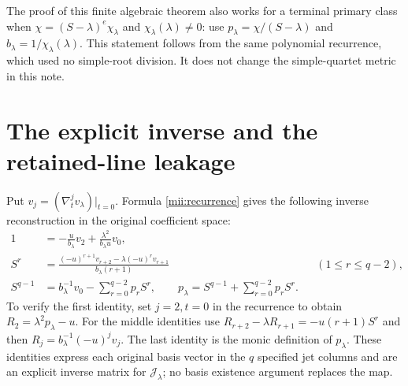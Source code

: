 \documentclass[11pt]{article}
\begin{document}
The proof of this finite algebraic theorem also works for a
terminal primary class when
$\chi=(S-\lambda)^e\chi_\lambda$ and $\chi_\lambda(\lambda)\ne0$:
use $p_\lambda=\chi/(S-\lambda)$ and
$b_\lambda=1/\chi_\lambda(\lambda)$. This statement follows from
the same polynomial recurrence, which used no simple-root
division. It does not change the simple-quartet metric in this note.

\section{The explicit inverse and the retained-line leakage}
Put $v_j=(\nabla_t^j v_\lambda)|_{t=0}$. Formula
\eqref{mii:recurrence} gives the following inverse reconstruction
in the original coefficient space:
\begin{equation}\tag{MII22}\label{mii:inverse}
 \begin{aligned}
 1&=-\frac{u}{b_\lambda}v_2
            +\frac{\lambda^2}{b_\lambda u}v_0,\\
 S^r&=\frac{(-u)^{r+1}v_{r+2}
                    -\lambda(-u)^r v_{r+1}}{b_\lambda(r+1)}
                &&(1\le r\le q-2),\\
 S^{q-1}&=b_\lambda^{-1}v_0-
                         \sum_{r=0}^{q-2}p_rS^r,
 \qquad p_\lambda=S^{q-1}+\sum_{r=0}^{q-2}p_rS^r.
 \end{aligned}
\end{equation}
To verify the first identity, set $j=2,t=0$ in the recurrence to
obtain $R_2=\lambda^2p_\lambda-u$. For the middle identities use
$R_{r+2}-\lambda R_{r+1}=-u(r+1)S^r$ and then
$R_j=b_\lambda^{-1}(-u)^jv_j$. The last identity is the monic
definition of $p_\lambda$. These identities express each original
basis vector in the $q$ specified jet columns and are an explicit
inverse matrix for $\mathcal J_\lambda$; no basis existence argument
replaces the map.
\end{document}
